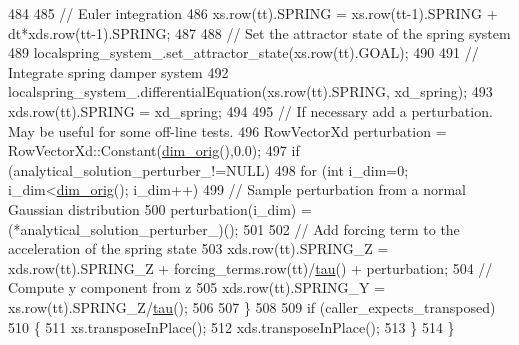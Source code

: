 \begin{DoxyCode}
484     
485     \textcolor{comment}{// Euler integration}
486     xs.row(tt).SPRING  = xs.row(tt-1).SPRING + dt*xds.row(tt-1).SPRING;
487   
488     \textcolor{comment}{// Set the attractor state of the spring system}
489     localspring\_system\_.set\_attractor\_state(xs.row(tt).GOAL);
490 
491     \textcolor{comment}{// Integrate spring damper system}
492     localspring\_system\_.differentialEquation(xs.row(tt).SPRING, xd\_spring);
493     xds.row(tt).SPRING = xd\_spring;
494     
495     \textcolor{comment}{// If necessary add a perturbation. May be useful for some off-line tests.}
496     RowVectorXd perturbation = RowVectorXd::Constant(\hyperlink{group__DynamicalSystems_ga93d7cbbf2e471b00f124e41706405a05}{dim\_orig}(),0.0);
497     \textcolor{keywordflow}{if} (analytical\_solution\_perturber\_!=NULL)
498       \textcolor{keywordflow}{for} (\textcolor{keywordtype}{int} i\_dim=0; i\_dim<\hyperlink{group__DynamicalSystems_ga93d7cbbf2e471b00f124e41706405a05}{dim\_orig}(); i\_dim++)
499         \textcolor{comment}{// Sample perturbation from a normal Gaussian distribution}
500         perturbation(i\_dim) = (*analytical\_solution\_perturber\_)();
501       
502     \textcolor{comment}{// Add forcing term to the acceleration of the spring state}
503     xds.row(tt).SPRING\_Z = xds.row(tt).SPRING\_Z + forcing\_terms.row(tt)/\hyperlink{group__DynamicalSystems_ga50eec7ad4c9664b5809ace45b22200d5}{tau}() + perturbation;
504     \textcolor{comment}{// Compute y component from z}
505     xds.row(tt).SPRING\_Y = xs.row(tt).SPRING\_Z/\hyperlink{group__DynamicalSystems_ga50eec7ad4c9664b5809ace45b22200d5}{tau}();
506     
507   \} 
508   
509   \textcolor{keywordflow}{if} (caller\_expects\_transposed)
510   \{
511     xs.transposeInPlace();
512     xds.transposeInPlace();
513   \}
514 \}
\end{DoxyCode}


